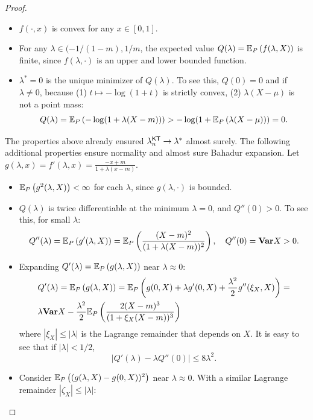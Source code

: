 \begin{proof}
\newcommand{\E}[1]{\Exp_P\left(#1\right)}
\begin{itemize}
    \item $f(\cdot,x)$ is convex for any $x\in[0,1]$.
    \item For any $\lambda \in (-1/(1-m), 1/m$, the expected value $Q(\lambda) = \E{f(\lambda, X)}$ is finite, since $f(\lambda, \cdot)$ is an upper and lower bounded function.
    \item $\lambda^* = 0$ is the unique minimizer of $Q(\lambda)$. To see this, $Q(0) = 0$ and if $\lambda \neq 0$, because (1)
    $t \mapsto -\log(1+t)$ is strictly convex, (2) $\lambda(X-\mu)$ is not a point mass:
\begin{equation}
     Q(\lambda) = \E{  -\log(1 + \lambda(X - m)) } > -\log(1 + \E{\lambda(X - \mu)}) = 0.
\end{equation}
\end{itemize}
The properties above already ensured $\lambda^{\mathsf{KT}}_n \to \lambda^* $ almost surely. The following additional properties ensure normality and almost sure Bahadur expansion. Let $g(\lambda, x) =f'(\lambda, x) = \frac{-x + m}{1 + \lambda(x-m)}$.
\begin{itemize}
    \item $\E{ g^2(\lambda, X) } < \infty$ for each $\lambda$, since $g(\lambda, \cdot)$ is bounded.
    \item $Q(\lambda)$ is twice differentiable at the minimum $\lambda = 0$, and $Q''(0) > 0$. To see this, for small $\lambda$:
    \begin{equation}
        Q''(\lambda) = \E{ g'(\lambda, X) } = \E{ \frac{(X - m)^2}{ (1 + \lambda(X-m))^2 }  }, \quad Q''(0) = \Var{X} > 0.
    \end{equation}
    \item Expanding $Q'(\lambda) = \E{g(\lambda, X)}$ near $\lambda \approx 0$:
    \begin{align}
        & Q'(\lambda) = \E{ g(\lambda, X)  } = \E{ g(0, X) + \lambda g'(0, X)  + \frac{\lambda^2}{2} g''(\xi_X , X) } =
        \\
        &\lambda \Var X - \frac{\lambda^2}{2} \E{ \frac{2(X - m)^3}{ (1 + \xi_X(X-m))^3 } }
    \end{align}
    where $|\xi_X| \le |\lambda|$ is the Lagrange remainder that depends on $X$. It is easy to see that if $|\lambda| < 1/2$,
    \begin{equation}
         |Q'(\lambda) - \lambda Q''(0)| \le 8 \lambda^2.
    \end{equation}
    \item Consider $\E{ (g(\lambda , X) - g(0 ,X) )^2 }$ near $\lambda \approx 0$. With a similar Lagrange remainder $|\zeta_X| \le |\lambda|$:

\end{itemize}
\end{proof}

